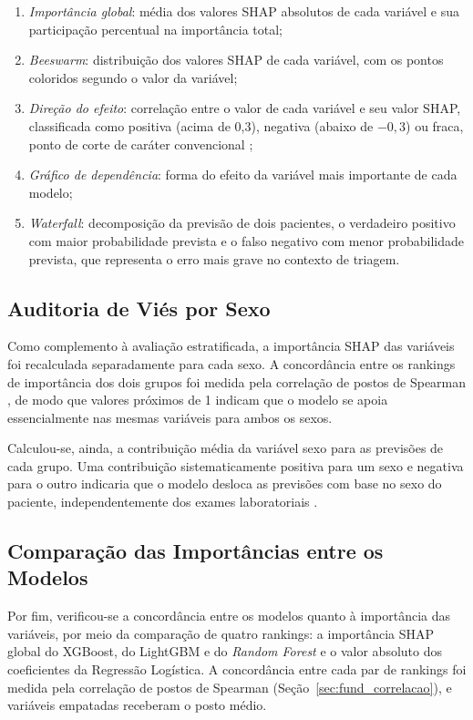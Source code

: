 \begin{enumerate}
    \item \textit{Importância global}: média dos valores SHAP absolutos de cada variável e sua participação percentual na importância total;
    \item \textit{Beeswarm}: distribuição dos valores SHAP de cada variável, com os pontos coloridos segundo o valor da variável;
    \item \textit{Direção do efeito}: correlação entre o valor de cada variável e seu valor SHAP, classificada como positiva (acima de 0,3), negativa (abaixo de $-0{,}3$) ou fraca, ponto de corte de caráter convencional \cite{Schober2018Correlation};
    \item \textit{Gráfico de dependência}: forma do efeito da variável mais importante de cada modelo;
    \item \textit{Waterfall}: decomposição da previsão de dois pacientes, o verdadeiro positivo com maior probabilidade prevista e o falso negativo com menor probabilidade prevista, que representa o erro mais grave no contexto de triagem.
\end{enumerate}

\subsection{Auditoria de Viés por Sexo}
\label{sec:shap_sexo}

Como complemento à avaliação estratificada, a importância SHAP das variáveis foi recalculada separadamente para cada sexo. A concordância entre os rankings de importância dos dois grupos foi medida pela correlação de postos de Spearman \cite{Schober2018Correlation}, de modo que valores próximos de 1 indicam que o modelo se apoia essencialmente nas mesmas variáveis para ambos os sexos.

Calculou-se, ainda, a contribuição média da variável sexo para as previsões de cada grupo. Uma contribuição sistematicamente positiva para um sexo e negativa para o outro indicaria que o modelo desloca as previsões com base no sexo do paciente, independentemente dos exames laboratoriais \cite{investigatingbiashealth}.

\subsection{Comparação das Importâncias entre os Modelos}
\label{sec:comparacao_importancias}

Por fim, verificou-se a concordância entre os modelos quanto à importância das variáveis, por meio da comparação de quatro rankings: a importância SHAP global do XGBoost, do LightGBM e do \textit{Random Forest} e o valor absoluto dos coeficientes da Regressão Logística. A concordância entre cada par de rankings foi medida pela correlação de postos de Spearman (Seção~\ref{sec:fund_correlacao}), e variáveis empatadas receberam o posto médio.

